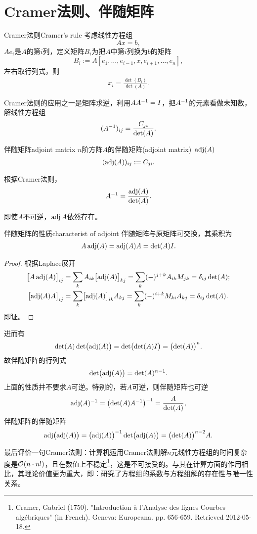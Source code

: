 \section{Cramer法则、伴随矩阵}
\begin{theorem}{Cramer法则}{Cramer's rule}
	考虑线性方程组
	\[
		Ax=b,
	\]
	$Ae_i$是$A$的第$i$列，定义矩阵$B_i$为把$A$中第$i$列换为$b$的矩阵 
	\[
		B_i:=A[e_1,\ldots,e_{i-1},x,e_{i+1},\ldots,e_n],
	\]
	左右取行列式，则
	\begin{align}
		x_i=\frac{\det(B_i)}{\det(A)}.
	\end{align}
\end{theorem}
Cramer法则的应用之一是矩阵求逆，利用$AA^{-1}=I$，把$A^{-1}$的元素看做未知数，解线性方程组
\[
	(A^{-1})_{ij}=\frac{C_{ji}}{\det(A)}.
\]
\begin{definition}{伴随矩阵}{adjoint matrix}
	$n$阶方阵$A$的伴随矩阵(adjoint matrix)~$\operatorname{adj}(A)$
	\begin{align}
		(\operatorname{adj}(A))_{ij}:=C_{ji}.
	\end{align}
\end{definition}
根据Cramer法则，
\begin{align}
	A^{-1}=\frac{\operatorname{adj}(A)}{\det(A)}.
\end{align}
\begin{remark}
	即使$A$不可逆，$\operatorname{adj} A$依然存在。
\end{remark}
\begin{theorem}{伴随矩阵的性质}{characterist of adjoint}
	伴随矩阵与原矩阵可交换，其乘积为
	\begin{align}
		A\operatorname{adj}(A)=\operatorname{adj}(A)A=\det(A)I.
	\end{align}
\end{theorem}
\begin{proof}
	根据Laplace展开
	\begin{align*}
		\bigfkh{A\adj(A)}_{ij}&=\sum_{k}A_{ik}\bigfkh{\adj(A)}_{kj}=\sum_{k}(-)^{j+k}A_{ik}M_{jk}=\vd_{ij}\det(A);\\
		\bigfkh{\adj(A)A}_{ij}&=\sum_{k}\bigfkh{\adj(A)}_{ik}A_{kj}=\sum_{k}(-)^{i+k}M_{ki}A_{kj}=\vd_{ij}\det(A).%
	\end{align*}
	即证。
\end{proof}
\begin{corollary}
	进而有
	\[
		\det(A)\det\bigl(\operatorname{adj}(A)\bigr)=\det\bigl(\det(A)I\bigr)=\bigl(\det(A)\bigr)^n.
	\]
	故伴随矩阵的行列式
	\begin{align}
		\det\bigl(\operatorname{adj}(A)\bigr)=\det(A)^{n-1}.
	\end{align}
	上面的性质并不要求$A$可逆。特别的，若$A$可逆，则伴随矩阵也可逆
	\begin{align}
		\operatorname{adj}(A)^{-1}=\bigl(\det(A)A^{-1}\bigr)^{-1}=\frac{A}{\det(A)},
	\end{align}
	伴随矩阵的伴随矩阵
	\begin{align}
		\operatorname{adj}\bigl(\operatorname{adj}(A)\bigr)=\bigl(\operatorname{adj}(A)\bigr)^{-1}\det\bigl(\operatorname{adj}(A)\bigr)=\bigl(\det(A)\bigr)^{n-2}A.
	\end{align}
\end{corollary}

最后评价一句Cramer法则：计算机运用Cramer法则解$n$元线性方程组的时间复杂度是$\mathcal O(n\cdot n!)$，且在数值上不稳定\footnote{Cramer, Gabriel (1750). "Introduction à l'Analyse des lignes Courbes algébriques" (in French). Geneva: Europeana. pp. 656-659. Retrieved 2012-05-18.}，这是不可接受的。与其在计算方面的作用相比，其理论价值更为重大，即：研究了方程组的系数与方程组解的存在性与唯一性关系。
